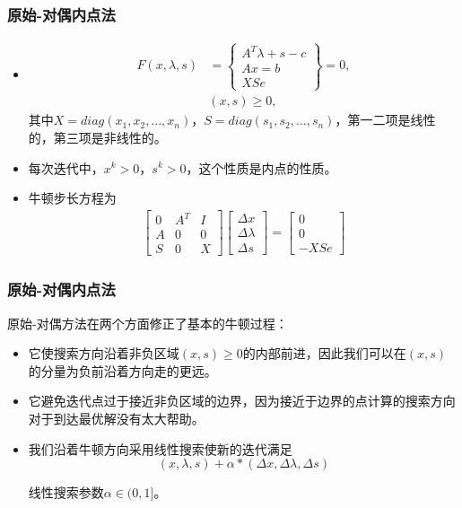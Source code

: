 \documentclass[notheorems,mathserif,table,compress]{beamer}  %
\begin{document}
%
\begin{frame}
\frametitle{原始-对偶内点法} 
\begin{itemize}
\item 
\begin{eqnarray*}
F(x,\lambda,s)&=\left\{\begin{array}{cc}     
A^{T}\lambda+s-c\\
Ax=b\\
XSe
\end{array}
\right\}=0,\\
&(x,s)\geq0,
\end{eqnarray*}
其中$X=diag(x_1,x_2,\dots,x_n)$，$S=diag(s_1,s_2,\dots,s_n)$，第一二项是线性的，第三项是非线性的。
\item 每次迭代中，$x^k>0$，$s^k>0$，这个性质是内点的性质。
\item 牛顿步长方程为
\begin{eqnarray*}
\begin{bmatrix}
0 & A^T & I\\
A & 0 & 0\\
S & 0 & X
\end{bmatrix}
\begin{bmatrix}
\Delta x\\
\Delta \lambda\\
\Delta s
\end{bmatrix}=
\begin{bmatrix}
0\\
0\\
-XSe
\end{bmatrix}
\end{eqnarray*}

\end{itemize}
\end{frame}

%
\begin{frame}
\frametitle{原始-对偶内点法} 
原始-对偶方法在两个方面修正了基本的牛顿过程：
\begin{itemize}
\item 它使搜索方向沿着非负区域$(x,s)\geq0$的内部前进，因此我们可以在$(x,s)$的分量为负前沿着方向走的更远。
\item 它避免迭代点过于接近非负区域的边界，因为接近于边界的点计算的搜索方向对于到达最优解没有太大帮助。
\end{itemize}
\begin{itemize}
\item 我们沿着牛顿方向采用线性搜索使新的迭代满足
\begin{displaymath}
(x,\lambda,s)+\alpha*(\Delta x,\Delta \lambda,\Delta s)
\end{displaymath}

线性搜索参数$\alpha\in(0,1]$。
\end{itemize}
\end{frame}
\end{document}
